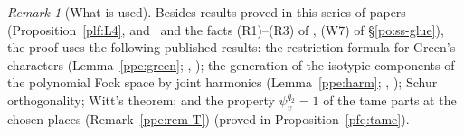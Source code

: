 \documentclass[10pt]{amsart}
\theoremstyle{definition}
\theoremstyle{remark}
\newtheorem{remark}[theorem]{Remark}
\begin{document}
\begin{remark}[What is used]\label{ppe:rem-used}
Besides results proved in this series of papers (Proposition~\ref{plf:L4}, {\cite[Lemma~6.8]{P49}} and~{\cite[Lemmas~3.32 and~3.62]{P53}} and the facts (R1)--(R3) of {\cite[\S3.1.6]{P53}}, (W7) of
\S\ref{po:ss-glue}), the proof uses the following published results: the restriction formula for
Green's characters (Lemma~\ref{ppe:green}; \cite[\S9]{ZelevinskyLNM}, \cite[Thm.~13]{Green1955}); the generation of
the isotypic components of the polynomial Fock space by joint harmonics (Lemma~\ref{ppe:harm};
\cite[Ch.~III, Corollary~5.4]{KashiwaraVergne}, \cite[Proposition~3.1]{HoweJAMS}); Schur orthogonality; Witt's theorem; and the property
$\psi_v^{q_2}=1$ of the tame parts at the chosen places (Remark~\ref{ppe:rem-T}) (proved in Proposition~\ref{pfq:tame}).
\end{remark}
\end{document}

